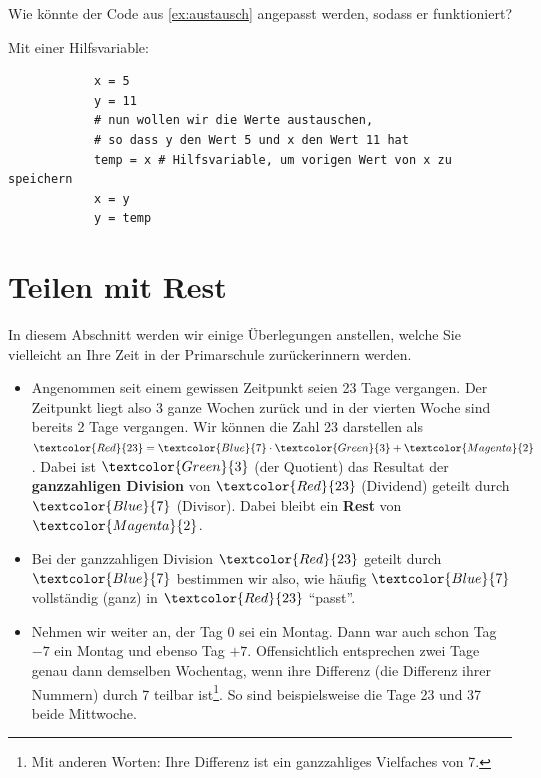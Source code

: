 \begin{myexercise}\label{ex:austausch-fix}
	Wie könnte der Code aus \cref{ex:austausch} angepasst werden, sodass er funktioniert?
	\begin{myanswer}
		Mit einer Hilfsvariable:
		\begin{lstlisting}
            x = 5 
            y = 11
            # nun wollen wir die Werte austauschen, 
            # so dass y den Wert 5 und x den Wert 11 hat
            temp = x # Hilfsvariable, um vorigen Wert von x zu speichern
            x = y
            y = temp
        \end{lstlisting}
	\end{myanswer}
\end{myexercise}

\section{Teilen mit Rest}
In diesem Abschnitt werden wir einige Überlegungen anstellen, welche Sie vielleicht an Ihre Zeit in der Primarschule zurückerinnern werden.
\begin{myexample}\label{myexample:teilenMitRest}
\phantom{1}
\begin{itemize}
	\item Angenommen seit einem gewissen Zeitpunkt seien 23 Tage vergangen. Der Zeitpunkt liegt also 3 ganze Wochen zurück und in der vierten Woche sind bereits 2 Tage vergangen.
	      Wir können die Zahl 23 darstellen als $\textcolor{Red}{23} = \textcolor{Blue}{7}\cdot \textcolor{Green}{3} + \textcolor{Magenta}{2}$. Dabei ist $\textcolor{Green}{3}$ (der Quotient) das Resultat der \textbf{ganzzahligen Division} von $\textcolor{Red}{23}$ (Dividend) geteilt durch $\textcolor{Blue}{7}$ (Divisor). Dabei bleibt ein \textbf{Rest} von $\textcolor{Magenta}{2}$.
	\item Bei der ganzzahligen Division $\textcolor{Red}{23}$ geteilt durch $\textcolor{Blue}{7}$ bestimmen wir also, wie häufig $\textcolor{Blue}{7}$ vollständig (ganz) in  $\textcolor{Red}{23}$ \enquote{passt}.
	\item Nehmen wir weiter an, der Tag 0 sei ein Montag. Dann war auch schon Tag $-7$ ein Montag und ebenso Tag $+7$.
	      Offensichtlich entsprechen zwei Tage genau dann demselben Wochentag, wenn ihre Differenz (die Differenz ihrer Nummern) durch 7 teilbar ist\footnote{Mit anderen Worten: Ihre Differenz ist ein ganzzahliges Vielfaches von 7.}.
	      So sind beispielsweise die Tage 23 und 37 beide Mittwoche.
\end{itemize}
\end{myexample}

